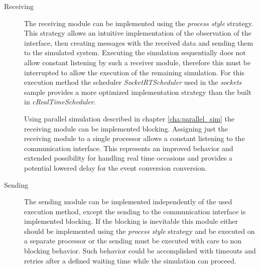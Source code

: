 \begin{description}
    \item[Receiving] The receiving module can be implemented using the \emph{process style} strategy.
    This strategy allows an intuitive implementation of the observation of the interface, then creating messages with the received data and sending them to the simulated system.
    Executing the simulation sequentially does not allow constant listening by such a receiver module, therefore this must be interrupted to allow the execution of the remaining simulation.
    For this execution method the scheduler \emph{SocketRTScheduler} used in the \emph{sockets} sample provides a more optimized implementation strategy than the built in \emph{cRealTimeScheduler}.
    
    Using parallel simulation described in chapter \ref{cha:parallel_sim} the receiving module can be implemented blocking.
    Assigning just the receiving module to a single processor allows a constant listening to the communication interface.
    This represents an improved behavior and extended possibility for handling real time occasions and provides a potential lowered delay for the event conversion conversion.
    
    \item[Sending] The sending module can be implemented independently of the used execution method, except the sending to the communication interface is implemented blocking.
    If the blocking is inevitable this module either should be implemented using the \emph{process style} strategy and be executed on a separate processor or the sending must be executed with care to non blocking behavior.
    Such behavior could be accomplished with timeouts and retries after a defined waiting time while the simulation can proceed.
\end{description}

